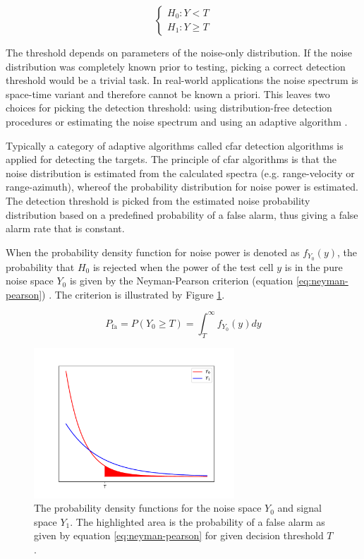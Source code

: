 \begin{equation}
    \label{eq:hypothesis-test}
    \begin{cases}
        H_{0}: Y < T \\
        H_{1}: Y \ge T
    \end{cases}
\end{equation}

The threshold depends on parameters of the noise-only distribution.
If the noise distribution was completely known prior to testing,
picking a correct detection threshold would be a trivial task.
In real-world applications the noise spectrum is space-time variant and therefore cannot be known a priori.
This leaves two choices for picking the detection threshold:
using distribution-free detection procedures \cite{distribution-free-detection} 
or estimating the noise spectrum and using an adaptive algorithm \cite{mean-level-detection}.

Typically a category of adaptive algorithms called \gls{cfar} detection algorithms is applied for detecting the targets.
The principle of \gls{cfar} algorithms is that the noise distribution is estimated from the calculated spectra (e.g. range-velocity or range-azimuth),
whereof the probability distribution for noise power is estimated.
The detection threshold is picked from the estimated noise probability distribution
based on a predefined probability of a false alarm, thus giving a false alarm rate that is constant.

When the probability density function for noise power is denoted as $f_{Y_0}(y)$,
the probability that $H_0$ is rejected when the power of the test cell $y$
is in the pure noise space $Y_0$
is given by the Neyman-Pearson criterion (equation \ref{eq:neyman-pearson}) \cite{fast-two-dimensional-cfar, neyman-pearson}.
The criterion is illustrated by Figure \ref{fig:neyman-pearson}.

\begin{equation}
    \label{eq:neyman-pearson}
    P_{\mathrm{fa}} = P(Y_0 \ge T) = \int_{T}^{\infty} f_{Y_0}(y)dy
\end{equation}

\begin{figure}
    \centering
    \includegraphics[width=0.67\textwidth]{fig/4/neyman-pearson.pdf}
    \caption{
        The probability density functions for the noise space $Y_0$ and signal space $Y_1$.
        The highlighted area is the probability of a false alarm as given by equation \ref{eq:neyman-pearson}
        for given decision threshold $T$.
    }
    \label{fig:neyman-pearson}
\end{figure}

